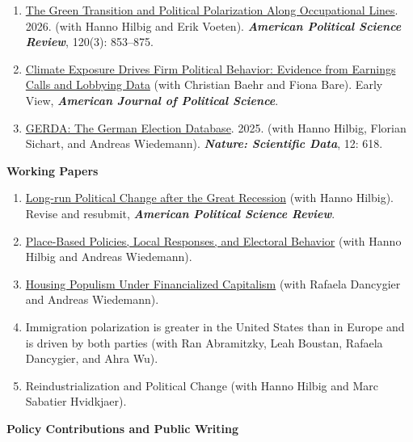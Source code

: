 \documentclass[letterpaper,10pt,oneside]{article}
\begin{document}
\begin{enumerate}
    \item \href{https://doi.org/10.1017/S0003055425101226}{The Green Transition and Political Polarization Along Occupational Lines}. 2026. (with Hanno Hilbig and Erik Voeten). \textbf{\textit{American Political Science Review}}, 120(3): 853--875.
    \item \href{https://onlinelibrary.wiley.com/doi/10.1111/ajps.70062}{Climate Exposure Drives Firm Political Behavior: Evidence from Earnings Calls and Lobbying Data} (with Christian Baehr and Fiona Bare). Early View, \textbf{\textit{American Journal of Political Science}}.
    \item \href{https://www.nature.com/articles/s41597-025-04811-5}{GERDA: The German Election Database}. 2025. (with Hanno Hilbig, Florian Sichart, and Andreas Wiedemann). \textbf{\textit{Nature: Scientific Data}}, 12: 618.
\end{enumerate}

\vspace{1ex}

{\large \textbf{Working Papers}}

\begin{enumerate}[itemsep=0.15em, topsep=0.4em]
    \item \href{https://osf.io/preprints/socarxiv/4zjac}{Long-run Political Change after the Great Recession} (with Hanno Hilbig). Revise and resubmit, \textbf{\textit{American Political Science Review}}.
    \item \href{https://osf.io/preprints/socarxiv/6h8cq}{Place-Based Policies, Local Responses, and Electoral Behavior} (with Hanno Hilbig and Andreas Wiedemann).
    \item \href{https://osf.io/preprints/socarxiv/s26vm_v2}{Housing Populism Under Financialized Capitalism} (with Rafaela Dancygier and Andreas Wiedemann).
    \item Immigration polarization is greater in the United States than in Europe and is driven by both parties (with Ran Abramitzky, Leah Boustan, Rafaela Dancygier, and Ahra Wu).
    \item Reindustrialization and Political Change (with Hanno Hilbig and Marc Sabatier Hvidkjaer).
\end{enumerate}

\vspace{1ex}

{\large \textbf{Policy Contributions and Public Writing}}
\end{document}
